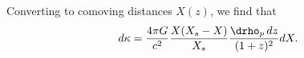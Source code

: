 Converting to comoving distances $X(z)$, we find that
\begin{equation}
\label{eqn:dkappa}
d\kappa = \frac{4 \pi G}{c^2}\frac{X (X_s - X)}{X_s} \frac{\drho_p\,dz}{(1+z)^2} dX.
\end{equation}
  